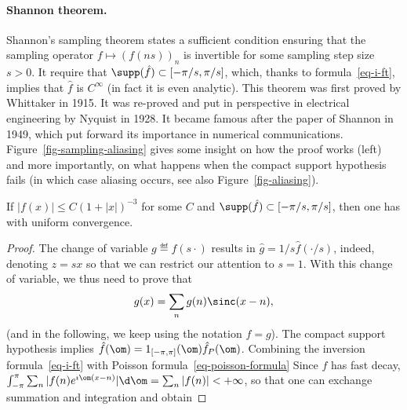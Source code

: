 \paragraph{Shannon theorem.}

Shannon's sampling theorem states a sufficient condition ensuring that the sampling operator $f \mapsto (f(ns))_n$ is invertible for some sampling step size $s>0$. 
%
It require that $\supp(\hat f) \subset [-\pi/s,\pi/s]$, which, thanks to formula~\eqref{eq-i-ft}, implies that $\hat f$ is $C^\infty$ (in fact it is even analytic). 
%
This theorem was first proved by Whittaker in 1915. It was re-proved and put in perspective in electrical engineering by Nyquist in 1928. It became famous after the paper of Shannon in 1949, which put forward its importance in numerical communications.
%
Figure~\ref{fig-sampling-aliasing} gives some insight on how the proof works (left) and more importantly, on what happens when the compact support hypothesis fails (in which case aliasing occurs, see also Figure~\ref{fig-aliasing}). 






\begin{thm} \label{thm-shannon-sampling}
	If $|f(x)| \leq C(1+|x|)^{-3}$ for some $C$ and $\supp(\hat f) \subset [-\pi/s,\pi/s]$, then one has
	with uniform convergence.
\end{thm}

\begin{proof} 
	The change of variable $g \eqdef f(s \cdot)$ results in $\hat g=1/s \hat f(\cdot/s)$, indeed, denoting $z=s x$
	so that we can restrict our attention to $s=1$. With this change of variable, we thus need to prove that
	$$
		g(x) = \sum_n g(n) \sinc(x-n), 
	$$
	(and in the following, we keep using the notation $f=g$).
	The compact support hypothesis implies $\hat f(\om) = 1_{[-\pi,\pi]}(\om) \hat f_P(\om)$.  
	Combining the inversion formula~\eqref{eq-i-ft} with Poisson formula~\eqref{eq-poisson-formula}
	Since $f$ has fast decay, $\int_{-\pi}^\pi \sum_n |f(n) e^{\imath \om (x-n)}| \d \om = \sum_n |f(n)| < +\infty$, so that one can exchange summation and integration and obtain
\end{proof}

